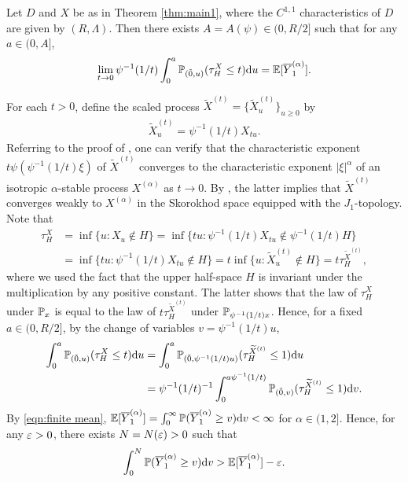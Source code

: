 \documentclass[11pt]{article}
\begin{document}
\begin{doublespace}
\begin{lemma}\label{lemma:half-space}
Let $D$ and $X$ be as in Theorem \ref{thm:main1}, where the $C^{1,1}$ characteristics of $D$ are given by $(R,\Lambda)$.  
Then there exists $A=A(\psi)\in(0,R/2]$ such that for any $a\in(0, A ]$,
\[
\lim_{t\to 0}\psi^{-1}(1/t)\int_{0}^{a}\P_{(\tilde{0},u)}(\tau^{X}_{H} \leq t)\ud u=\E[\overline{Y}^{(\alpha)}_{1}].
\]
\end{lemma}
\pf
For each $t>0$, define the scaled process $\widetilde{X}^{(t)}=\{\widetilde{X}^{(t)}_{u}\}_{u\geq 0}$ by
\begin{align}\label{def:Xtilde}
\widetilde{X}_{u}^{(t)}=\psi^{-1}(1/t)X_{tu}.
\end{align}
Referring to the proof of \cite[Lemma 4.5]{GPS19}, one can verify that the characteristic exponent $t\psi(\psi^{-1}(1/t)\xi)$ of $\widetilde{X}^{(t)}$ converges to the characteristic exponent $|\xi|^\alpha$ of an isotropic $\alpha$-stable process $X^{(\alpha)}$ as $t\to 0$. By \cite[Exercise 16.10]{Kallenberg2002}, the latter implies that $\widetilde{X}^{(t)}$ converges weakly to $X^{(\alpha)}$ in the Skorokhod space equipped with the $J_1$-topology.
Note that 
\begin{align*}
\tau_{H}^{X}
&=\inf\{u : X_{u}\notin H\}
=\inf\{tu: \psi^{-1}(1/t) X_{tu}\notin \psi^{-1}(1/t) H\}\\
&=\inf\{tu: \psi^{-1}(1/t)X_{tu}\notin H\}
=t\inf\{u: \widetilde{X}_{u}^{(t)} \notin H\}=t\tau_{H}^{\widetilde{X}^{(t)}},
\end{align*}
where we used the fact that the upper half-space $H$ is invariant under the multiplication by any positive constant. The latter
 shows that the law of $\tau_{H}^{X}$ under $\P_{x}$ is equal to the law of $t\tau_{H}^{\widetilde{X}^{(t)}}$ under $\P_{\psi^{-1}(1/t)x}$.
Hence, for a fixed $a\in(0,R/2]$, by the change of variables $v=\psi^{-1}(1/t)u$,
\begin{align}\label{eqn:half-space}
\int_{0}^{a}\P_{(\tilde{0},u)}(\tau_{H}^X \leq t)\ud u
&=\int_{0}^{a}\P_{(\tilde{0},\psi^{-1}(1/t)u)}(\tau_{H}^{\widetilde{X}^{(t)}} \leq 1)\ud u\nn\\
&=\psi^{-1}(1/t)^{-1}\int_{0}^{a\psi^{-1}(1/t)}\P_{(\tilde{0},v)}(\tau_{H}^{\widetilde{X}^{(t)}}\leq  1)\ud v.
\end{align}
By \eqref{eqn:finite mean}, $\E[\overline{Y}_{1}^{(\alpha)}]=\int_{0}^{\infty}\P(\overline{Y}_{1}^{(\alpha)}\geq v)\ud v<\infty$ for $\alpha\in (1,2]$. Hence, for any $\eps>0$, there exists $N=N(\eps)>0$ such that 
\[
\int_{0}^{N}\P(\overline{Y}_{1}^{(\alpha)}\geq v)\ud v>\E[\overline{Y}_{1}^{(\alpha)}]-\eps.
\]
\end{doublespace}
\end{document}
